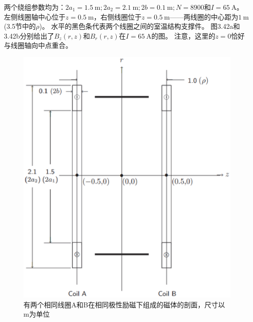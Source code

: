 两个绕组参数均为：$2a_1 = 1.5\ \mathrm{m}; 2a_2 = 2.1\ \mathrm{m}; 2b = 0.1\ \mathrm{m};
N =8900$和$I =65\ \mathrm{A}$。
左侧线圈轴中心位于$z=0.5\ \mathrm{m}$，右侧线圈位于$z = 0.5 \ \mathrm{m}$——两线圈的中心距为$1\ \mathrm{m}$ (3.5节中的$\rho$)。
水平的黑色条代表两个线圈之间的室温结构支撑件。
图3.42a和3.42b分别给出了$B_z(r, z)$和$B_r(r, z)$在$I =65\ \mathrm{A}$的图。
注意，这里的$z=0$恰好与线圈轴向中点重合。
\begin{figure}[htbp]
	\centering
	\includegraphics[scale=0.5]{chpt3/figs/fig3.41.eps}
	\caption{有两个相同线圈A和B在相同极性励磁下组成的磁体的剖面，尺寸以m为单位}
\end{figure}

